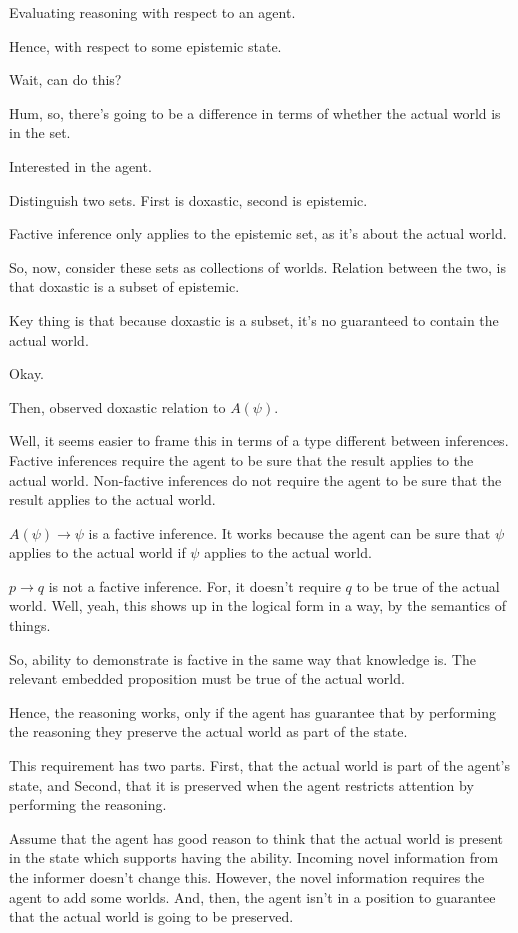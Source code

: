 \documentclass[10pt]{article}
\begin{document}
\begin{note}
  Evaluating reasoning with respect to an agent.

  Hence, with respect to some epistemic state.

  Wait, can do this?

  Hum, so, there's going to be a difference in terms of whether the actual world is in the set.

  Interested in the agent.

  Distinguish two sets.
  First is doxastic, second is epistemic.

  Factive inference only applies to the epistemic set, as it's about the actual world.

  So, now, consider these sets as collections of worlds.
  Relation between the two, is that doxastic is a subset of epistemic.

  Key thing is that because doxastic is a subset, it's no guaranteed to contain the actual world.

  Okay.

  Then, observed doxastic relation to \(A(\psi)\).


  Well, it seems easier to frame this in terms of a type different between inferences.
  Factive inferences require the agent to be sure that the result applies to the actual world.
  Non-factive inferences do not require the agent to be sure that the result applies to the actual world.

  \(A(\psi) \rightarrow \psi\) is a factive inference.
  It works because the agent can be sure that \(\psi\) applies to the actual world if \(\psi\) applies to the actual world.

  \(p \rightarrow q\) is not a factive inference.
  For, it doesn't require \(q\) to be true of the actual world.
  Well, yeah, this shows up in the logical form in a way, by the semantics of things.

  So, ability to demonstrate is factive in the same way that knowledge is.
  The relevant embedded proposition must be true of the actual world.

  Hence, the reasoning works, only if the agent has guarantee that by performing the reasoning they preserve the actual world as part of the state.

  This requirement has two parts.
  First, that the actual world is part of the agent's state, and
  Second, that it is preserved when the agent restricts attention by performing the reasoning.

  Assume that the agent has good reason to think that the actual world is present in the state which supports having the ability.
  Incoming novel information from the informer doesn't change this.
  However, the novel information requires the agent to add some worlds.
  And, then, the agent isn't in a position to guarantee that the actual world is going to be preserved.
\end{note}
\end{document}
